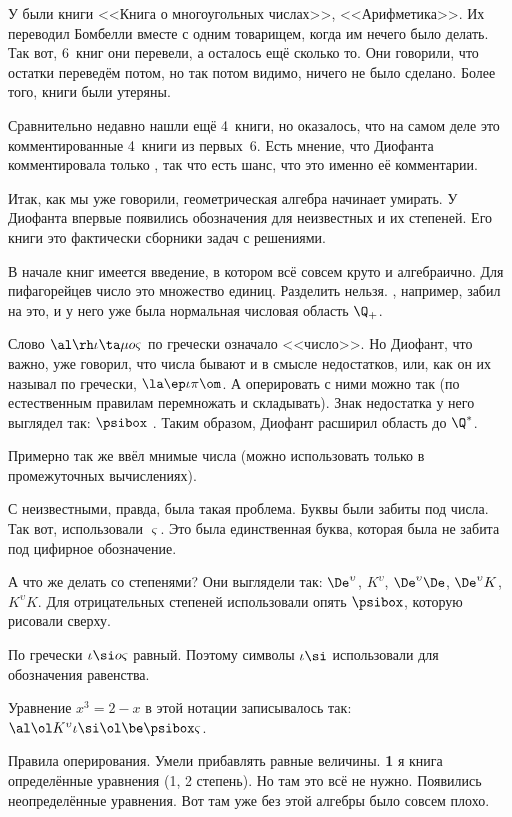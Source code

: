 \documentclass[a4paper,oneside,fleqn,10pt]{article}
\renewcommand{\isp}{\psibox}
\begin{document}
У  были книги <<Книга о многоугольных числах>>, <<Арифметика>>. Их переводил Бомбелли
вместе с одним товарищем, когда им нечего было делать. Так вот, 6~книг они перевели,
а осталось ещё сколько то. Они говорили, что остатки переведём потом, но так потом видимо, ничего не
было сделано. Более того, книги были утеряны.

Сравнительно недавно нашли ещё 4~книги, но оказалось, что на самом деле это комментированные 4~книги из первых~6.
Есть мнение, что Диофанта комментировала только , так что есть шанс, что это именно
её комментарии.

Итак, как мы уже говорили, геометрическая алгебра начинает умирать. У Диофанта впервые появились
обозначения для неизвестных и их степеней. Его книги это фактически сборники задач с решениями.

В начале книг имеется введение, в котором всё совсем круто и алгебраично.
Для пифагорейцев число это множество единиц. Разделить нельзя. ,
например, забил на это, и у него уже была нормальная числовая область $\Q_+$.

Слово $\al\rh\iota\ta\mu o\varsigma$ по гречески означало <<число>>.
Но Диофант, что важно, уже говорил, что числа бывают и в смысле недостатков, или, как
он их называл по гречески, $\la\ep\iota\pi\om$.
А оперировать с ними можно так (по естественным правилам перемножать и складывать).
Знак недостатка у него выглядел так:  $\isp$
. Таким образом, Диофант расширил область до $\Q^*$.

Примерно так же  ввёл мнимые числа (можно использовать только в промежуточных вычислениях).

С неизвестными, правда, была такая проблема. Буквы были забиты под
числа.  Так вот, использовали $\varsigma$. Это была единственная
буква, которая была не забита под цифирное обозначение.

А что же делать со степенями? Они выглядели так:
$\De^\upsilon$, $K^\upsilon$, $\De^\upsilon\De$, $\De^\upsilon K$, $K^\upsilon K$.
Для отрицательных степеней использовали опять $\isp$, которую рисовали сверху.

По гречески $\iota\si o\varsigma$ равный. Поэтому символы $\iota\si$ использовали для обозначения
равенства.

Уравнение $x^3 = 2-x$ в этой нотации записывалось так:
$\al\ol K^\upsilon \iota \si \ol\be\isp\varsigma$.

Правила оперирования. Умели прибавлять равные величины. \textbf{1} я книга определённые уравнения
(1, 2 степень). Но там это всё не нужно.
Появились неопределённые уравнения. Вот там уже без этой алгебры было совсем плохо.
\end{document}
